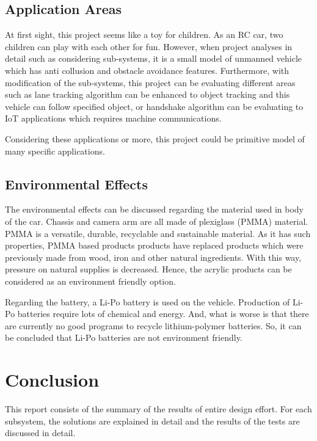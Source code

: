 \documentclass[a4paper,12pt]{article}
\begin{document}
	\subsection{Application Areas}
		At first sight, this project seems like a toy for children. As an RC car, two children can play with each other for fun. However, when project analyses in detail such as considering sub-systems, it is a small model of unmanned vehicle which has anti collusion and obstacle avoidance features. Furthermore, with modification of the sub-systems, this project can be evaluating different areas such as lane tracking algorithm can be enhanced to object tracking and this vehicle can follow specified object, or handshake algorithm can be evaluating to IoT applications which requires machine communications.
		
		Considering these applications or more, this project could be primitive model of many specific applications.

	\subsection{Environmental Effects}
		
		The environmental effects can be discussed regarding the material used in body of the car. Chassis and camera arm are all made of plexiglass (PMMA) material. PMMA is a versatile, durable, recyclable and sustainable material. As it has such properties, PMMA based products products have replaced products which were previously made from wood, iron and other natural ingredients. With this way, pressure on natural supplies is decreased. Hence, the acrylic products can be considered as an environment friendly option.

		Regarding the battery, a Li-Po battery is used on the vehicle. Production of Li-Po batteries require lots of chemical and energy. And, what is worse is that there are currently no good programs to recycle lithium-polymer batteries. So, it can be concluded that Li-Po batteries are not environment friendly.


	\section{Conclusion}
	
		This report consists of the summary of the results of entire design effort. For each subsystem, the solutions are explained in detail and the results of the tests are discussed in detail. \\
		
\end{document}
